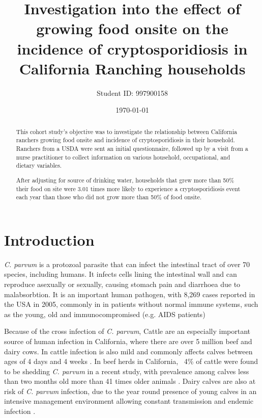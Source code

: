 \documentclass[12pt]{article}
\title{Investigation into the effect of growing food onsite on the incidence of cryptosporidiosis in California Ranching households}
\author{Student ID: 997900158}
\date{\today}
\begin{document}
	\maketitle
	\begin{abstract}
		This cohort study's objective was to investigate the relationship between California ranchers growing food onsite and incidence of cryptosporidiosis in their household.
		Ranchers from a USDA were sent an initial questionnaire, followed up by a visit from a nurse practitioner to collect information on various household, occupational, and dietary variables.


		After adjusting for source of drinking water, households that grew more than 50\% their food  on site were 3.01 times more likely to experience a cryptosporidiosis event each year than those who did not grow more than 50\% of food onsite.

	\end{abstract}

\onehalfspace
	\section{Introduction} 
	\emph{C. parvum} is a protozoal parasite that can infect the intestinal tract of over 70 species, \cite{Casemore1997} including humans.
	It infects cells lining the intestinal wall and can reproduce asexually or sexually, causing stomach pain and diarrhoea due to malabsorbtion\cite{malmo2010}.
	It is an important human pathogen, with 8,269 cases reported in the USA in 2005, commonly in in patients without normal immune systems, such as the young, old and immunocompromised (e.g. AIDS patients) \cite{Yoder2007}


	Because of the cross infection of \emph{C. parvum}, Cattle are an especially important source of human infection in California, where there are over 5 million beef and dairy cows. \cite{WesternFarm}
	In cattle infection is also mild and commonly affects calves between ages of 4 days and 4 weeks \cite{malmo2010}. 
	In beef herds in California, ~4\% of cattle were found to be shedding \emph{C. parvum} in a recent study, with prevalence among calves less than two months old more than 41 times older animals \cite{Atwill1999a}.
	Dairy calves are also at risk of \emph{C. parvum} infection, due to the year round presence of young calves in an intensive management environment allowing constant transmission and endemic infection .\cite{Atwill1998}
	
\end{document}
